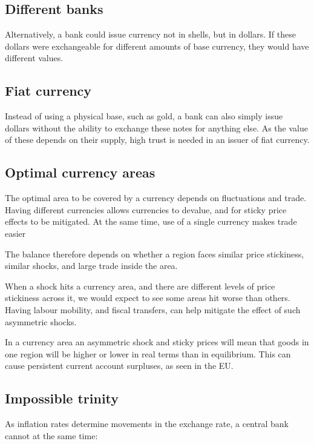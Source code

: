 \subsection{Different banks}

Alternatively, a bank could issue currency not in shells, but in dollars. If these dollars were exchangeable for different amounts of base currency, they would have different values.

\subsection{Fiat currency}

Instead of using a physical base, such as gold, a bank can also simply issue dollars without the ability to exchange these notes for anything else. As the value of these depends on their supply, high trust is needed in an issuer of fiat currency.

\subsection{Optimal currency areas}

The optimal area to be covered by a currency depends on fluctuations and trade. Having different currencies allows currencies to devalue, and for sticky price effects to be mitigated. At the same time, use of a single currency makes trade easier

The balance therefore depends on whether a region faces similar price stickiness, similar shocks, and large trade inside the area.

When a shock hits a currency area, and there are different levels of price stickiness across it, we would expect to see some areas hit worse than others. Having labour mobility, and fiscal transfers, can help mitigate the effect of such asymmetric shocks.

In a currency area an asymmetric shock and sticky prices will mean that goods in one region will be higher or lower in real terms than in equilibrium. This can cause persistent current account surpluses, as seen in the EU.

\subsection{Impossible trinity}

As inflation rates determine movements in the exchange rate, a central bank cannot at the same time:


